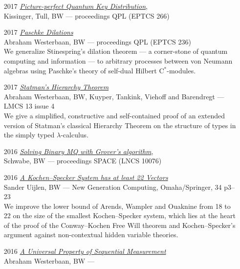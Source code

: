 \documentclass{article}
\begin{document}
\begin{itemize}
{        Westerbaan, BW, van de Wetering --- proceedings QPL (EPTCS 287)}
    \item[2017] \emph{\href{https://arxiv.org/abs/1704.08668}{Picture-perfect Quantum Key Distribution}}, \\{\footnotesize
        Kissinger, Tull, BW --- proceedings QPL (EPTCS 266)}
    \item[2017] \emph{\href{http://eptcs.web.cse.unsw.edu.au/paper.cgi?QPL2016.15}{Paschke Dilations}}\\
    {\footnotesize Abraham Westerbaan, BW --- proceedings QPL (EPTCS 236)}\\
    We generalize Stinespring's dilation theorem --- a corner-stone
        of quantum computing and information --- to arbitrary processes
        between von Neumann algebras using Paschke's theory of
        self-dual Hilbert C$^*$-modules.
    \item[2017] \emph{\href{https://lmcs.episciences.org/4089}{Statman's Hierarchy Theorem}}\\
    {\footnotesize Abraham Westerbaan, BW,  Kuyper, Tankink, Viehoff and Barendregt --- LMCS 13 issue 4}\\
    We give a simplified, constructive and self-contained proof
        of an extended version of Statman's classical Hierarchy Theorem
        on the structure of types in the simply typed $\lambda$-calculus.
    \item[2016] \emph{\href{https://link.springer.com/chapter/10.1007/978-3-319-49445-6_17}{Solving Binary MQ with Grover's algorithm}}, \\{\footnotesize
        Schwabe, BW --- proceedings SPACE (LNCS 10076)}
    \item[2016] \emph{\href{https://link.springer.com/article/10.1007/s00354-016-0202-5}{A Kochen--Specker System has at least 22 Vectors}}\\
    {\footnotesize Sander Uijlen, BW ---  New Generation Computing, Omaha/Springer, 34 p3--23}\\
    We improve the lower bound of Arends, Wampler and Ouaknine from 18 to 22
    on the size of the smallest Kochen--Specker system, which lies
    at the heart of the proof of the Conway--Kochen Free Will
    theorem and Kochen--Specker's argument against non-contextual
    hidden variable theories.
    \item[2016] \emph{\href{http://scitation.aip.org/content/aip/journal/jmp/57/9/10.1063/1.4961526}{A Universal Property of Sequential Measurement}}\\
    {\footnotesize Abraham Westerbaan, BW ---
}
\end{itemize}
\end{document}
